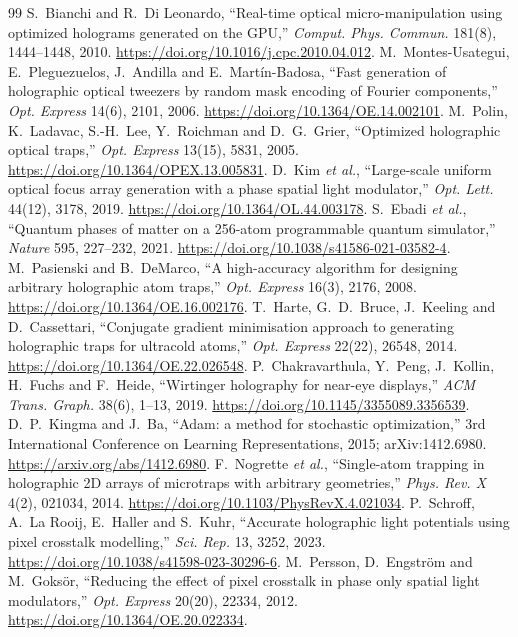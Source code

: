 \begin{thebibliography}{99}
 S.~Bianchi and R.~Di Leonardo, ``Real-time optical micro-manipulation using optimized holograms generated on the GPU,'' \emph{Comput. Phys. Commun.} 181(8), 1444--1448, 2010. \url{https://doi.org/10.1016/j.cpc.2010.04.012}.
 M.~Montes-Usategui, E.~Pleguezuelos, J.~Andilla and E.~Mart\'in-Badosa, ``Fast generation of holographic optical tweezers by random mask encoding of Fourier components,'' \emph{Opt. Express} 14(6), 2101, 2006. \url{https://doi.org/10.1364/OE.14.002101}.
 M.~Polin, K.~Ladavac, S.-H.~Lee, Y.~Roichman and D.~G.~Grier, ``Optimized holographic optical traps,'' \emph{Opt. Express} 13(15), 5831, 2005. \url{https://doi.org/10.1364/OPEX.13.005831}.
 D.~Kim \emph{et al.}, ``Large-scale uniform optical focus array generation with a phase spatial light modulator,'' \emph{Opt. Lett.} 44(12), 3178, 2019. \url{https://doi.org/10.1364/OL.44.003178}.
 S.~Ebadi \emph{et al.}, ``Quantum phases of matter on a 256-atom programmable quantum simulator,'' \emph{Nature} 595, 227--232, 2021. \url{https://doi.org/10.1038/s41586-021-03582-4}.
 M.~Pasienski and B.~DeMarco, ``A high-accuracy algorithm for designing arbitrary holographic atom traps,'' \emph{Opt. Express} 16(3), 2176, 2008. \url{https://doi.org/10.1364/OE.16.002176}.
 T.~Harte, G.~D.~Bruce, J.~Keeling and D.~Cassettari, ``Conjugate gradient minimisation approach to generating holographic traps for ultracold atoms,'' \emph{Opt. Express} 22(22), 26548, 2014. \url{https://doi.org/10.1364/OE.22.026548}.
 P.~Chakravarthula, Y.~Peng, J.~Kollin, H.~Fuchs and F.~Heide, ``Wirtinger holography for near-eye displays,'' \emph{ACM Trans. Graph.} 38(6), 1--13, 2019. \url{https://doi.org/10.1145/3355089.3356539}.
 D.~P.~Kingma and J.~Ba, ``Adam: a method for stochastic optimization,'' 3rd International Conference on Learning Representations, 2015; arXiv:1412.6980. \url{https://arxiv.org/abs/1412.6980}.
 F.~Nogrette \emph{et al.}, ``Single-atom trapping in holographic 2D arrays of microtraps with arbitrary geometries,'' \emph{Phys. Rev. X} 4(2), 021034, 2014. \url{https://doi.org/10.1103/PhysRevX.4.021034}.
 P.~Schroff, A.~La Rooij, E.~Haller and S.~Kuhr, ``Accurate holographic light potentials using pixel crosstalk modelling,'' \emph{Sci. Rep.} 13, 3252, 2023. \url{https://doi.org/10.1038/s41598-023-30296-6}.
 M.~Persson, D.~Engstr\"om and M.~Goks\"or, ``Reducing the effect of pixel crosstalk in phase only spatial light modulators,'' \emph{Opt. Express} 20(20), 22334, 2012. \url{https://doi.org/10.1364/OE.20.022334}.

\end{thebibliography}
